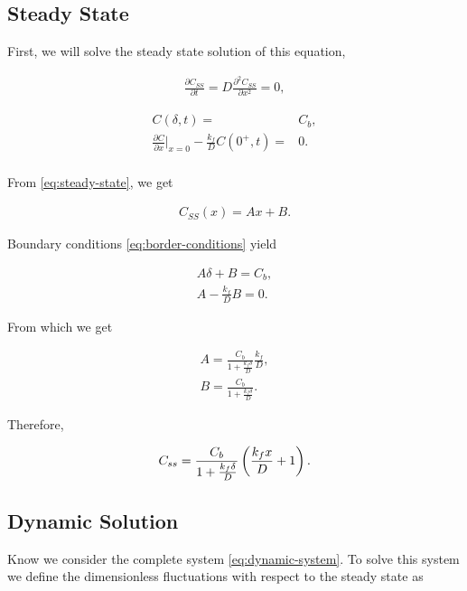 	\subsection{Steady State}
	
	First, we will solve the steady state solution of this equation,
	
	\begin{align}
		\frac{\partial C_{SS}}{\partial t} = D \frac{\partial^2 C_{SS}}{\partial x^2} = 0,
		\label{eq:steady-state}
	\end{align}
	
	\begin{align}
		C(\delta, t) =& C_b,\\
		\frac{\partial C}{\partial x}\big|_{x=0} -\frac{k_f}{D}C(0^+,t) =& 0.\\
		\label{eq:border-conditions}
	\end{align}
	
	From \ref{eq:steady-state}, we get
	
	\begin{align}
		C_{SS}(x) = A x + B.
	\end{align}


Boundary conditions \ref{eq:border-conditions} yield

\begin{align}
	A\delta + B = C_b,\\
	A-\frac{k_f}{D} B = 0.
\end{align}

From which we get

\begin{align}
	A = \frac{C_b}{1+\frac{k_f\delta}{D}}\frac{k_f}{D},\\
	B = \frac{C_b}{1+\frac{k_f\delta}{D}}.
\end{align}

Therefore,

\begin{align}
	C_{ss} = \frac{C_b}{1+\frac{k_f\delta}{D}} \left({\frac{k_fx}{D} + 1}\right).
	\label{eq:steady-state-sol}
\end{align}


\subsection{Dynamic Solution}

Know we consider the complete system \ref{eq:dynamic-system}. To solve this system we define the dimensionless fluctuations with respect to the steady state as

